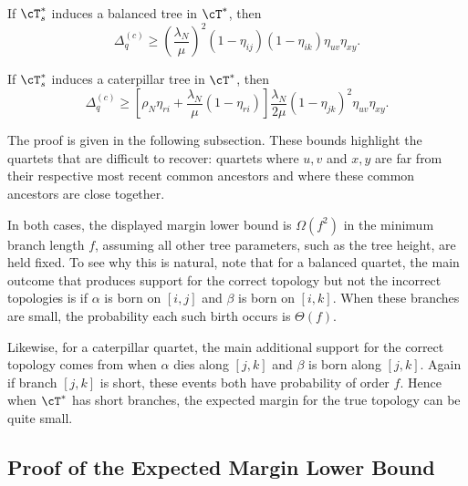 \begin{lemma}\label{lem:canby_expected_margin}

    If $\cT_s^*$ induces a balanced tree in $\cT^*$, then
    \[\Delta^{(c)}_q \geq \left(\frac{\lambda_N}{\mu} \right)^2(1-\eta_{ij})(1-\eta_{ik}) \eta_{uv} \eta_{xy}.   \]

\noindent If $\cT_s^*$ induces a caterpillar tree in $\cT^*$, then
%
\[\Delta^{(c)}_q \geq \left[\rho_N \eta_{ri} + \frac{\lambda_N}{\mu}(1-\eta_{ri})\right]
\frac{\lambda_N}{2\mu}(1-\eta_{jk})^2\eta_{uv}\eta_{xy}. \]
%

\end{lemma}

\noindent
The proof is given in the following subsection. These bounds highlight the quartets that are difficult to recover:
quartets where $u,v$ and $x,y$ are far from their respective most
recent common ancestors and where these common ancestors
are close together.


In both cases, the displayed margin lower bound is $\Omega(f^2)$ in the minimum branch length $f$,
assuming all other tree parameters, such as the tree height, are held fixed. To see why
this is natural, note that for a balanced quartet, the main outcome that produces support for the correct topology
but not the incorrect topologies is if $\alpha$ is born on $[i,j]$ and  $\beta$ is born on $[i,k]$. When these branches
are small, the probability each such birth occurs is $\Theta(f)$.

Likewise, for a caterpillar quartet, the main additional support for the correct topology comes from when
$\alpha$ dies along $[j,k]$ and $\beta$ is born along $[j,k]$. Again if branch $[j,k]$ is short, these events
both have probability of order $f$. Hence when $\cT^*$ has short branches, the expected margin for the true
topology can be quite small.


\subsection{Proof of the Expected Margin Lower Bound}


